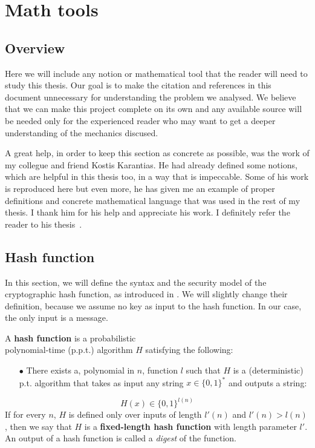 \chapter{Math tools} \label{ch:math}
%
\section{Overview}
Here we will include any notion or mathematical tool that the reader will need to study this thesis. Our goal is to make the citation and references in this document unnecessary for understanding the problem we analysed. We believe that we can make this project complete on its own and any available source will be needed only for the experienced reader who may want to get a deeper understanding of the mechanics discused.

A great help, in order to keep this section as concrete as possible, was the work of my collegue and friend Kostis Karantias. He had already defined some notions, which are helpful in this thesis too, in a way that is impeccable. Some of his work is reproduced here but even more, he has given me an example of proper definitions and concrete mathematical language that was used in the rest of my thesis. I thank him for his help and appreciate his work. I definitely refer the reader to his thesis~\cite{gtklocker}.
%
\section{Hash function}
%
In this section, we will define the syntax and the security model of the cryptographic hash function, as introduced in \cite{Katz:2007:IMC:1206501}. We will slightly change their definition, because we assume no key as input to the hash function. In our case, the only input is a message.
%
\begin{definition}
A \textbf{hash function} is a probabilistic \\
polynomial-time (p.p.t.) algorithm $H$ satisfying the following:
\begin{itemize}
  \item[$\bullet$] There exists a, polynomial in $n$, function $l$ such that $H$ is a (deterministic) p.t. algorithm that takes as input any string $x \in { \{ 0,1 \}}^*$ and outputs a string:
\end{itemize}
\begin{equation}
  H(x) \in { \{ 0,1 \}}^{l(n)}
\end{equation}
If for every $n$, $H$ is defined only over inputs of length $l'(n)$ and $l'(n) > l(n)$, then
we say that $H$ is a \textbf{fixed-length hash function} with length parameter $l'$. An output of a hash function is called a \emph{digest} of the function.
\end{definition}

